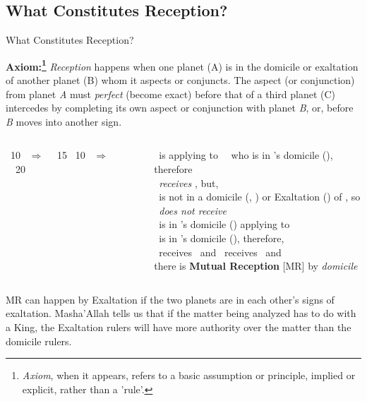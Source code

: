 \subsection{What Constitutes Reception?}
\begin{frame}[t]{What Constitutes Reception?}
\small
\begin{block}{}
\textbf{Axiom:\footnote{\textsl{Axiom}, when it appears, refers to a basic assumption or principle, implied or explicit, rather than a 'rule'.}} {
\textsl{Reception} happens when one planet (A) is in the domicile or exaltation of another planet (B) whom it aspects or conjuncts.
The aspect (or conjunction) from planet \textsl{A} must \textsl{perfect} (become exact)  before that of a third planet (C) intercedes by completing its own aspect or conjunction with planet \textsl{B}, or, before \textsl{B} moves into another sign.}
\end{block}

\vspace{0.1cm}
\begin{columns}[T, onlytextwidth]
\Mars\ 10 \Aries\ $\Rightarrow$ \Conjunction\ \Saturn\ 15 \Aries
\vspace{1.5cm}
\Mars\ 10 \Capricorn\ $\Rightarrow$ \Square\ \Saturn\ 20 \Aries

\rule{.1mm}{.4\textheight}

\Mars\ is applying to \Conjunction\ \Saturn\ who is in \Mars's domicile (\Aries), therefore\\
\Mars\ \textsl{receives} \Saturn, but, \\
\Mars\ is not in a domicile (\Capricorn, \Aquarius) or Exaltation (\Libra) of \Saturn, so \\
\Saturn\ \textsl{does not receive} \Mars \\
\vspace{0.1cm}
\ul
\Mars\ is in \Saturn's domicile (\Capricorn) applying to \Square\ \Saturn \\
\Saturn\ is in \Mars's domicile (\Aries), therefore, \\
\Mars\ receives \Saturn\ and \Saturn\ receives \Mars\ and \\
there is \textbf{Mutual Reception} [MR] by \textsl{domicile}
\end{columns}
\vspace{0.2cm}
 MR can happen by Exaltation if the two planets are in each other's signs of exaltation. Masha'Allah tells us that if the matter being analyzed has to do with a King, the Exaltation rulers will have more authority over the matter than the domicile rulers.
\end{frame}